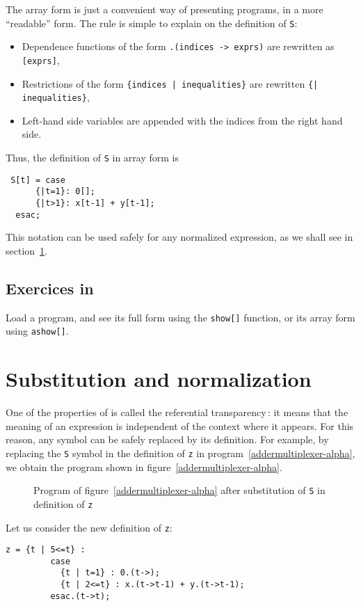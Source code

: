 The array form is just a convenient way of presenting {\alfa} programs, 
in a more ``readable'' form. The rule is simple to explain on the 
definition of {\tt S}:
\begin{itemize}
\item Dependence functions of the form {\tt .(indices -> exprs)} are rewritten
as {\tt [exprs]}, 
\item Restrictions of the form {\tt \{indices | inequalities\}} are rewritten
{\tt \{| inequalities\}},
\item Left-hand side variables are appended with the indices from the
right hand side.
\end{itemize}
Thus, the definition of {\tt S} in array form is
\begin{verbatim}
 S[t] = case
      {|t=1}: 0[];
      {|t>1}: x[t-1] + y[t-1];
  esac;
\end{verbatim}
This notation can be used safely for any normalized expression, as 
we shall see in section~\ref{substitution}.
\subsection*{Exercices in {\mmalfa}}
Load a program, and see its full form using the {\tt show[]}
function, or its array form using {\tt ashow[]}.
\section{Substitution and normalization}
\label{substitution}
One of the properties of {\alfa} is called the referential transparency\,:
it means that the meaning of an expression is independent of the context
where it appears. 
For this reason, any symbol can be safely replaced by its definition. 
For example, by replacing the {\tt S} symbol in the definition of 
{\tt z} in program~\ref{addermultiplexer-alpha}, we obtain the 
program shown in figure~\ref{addermultiplexer-alpha}.
\begin{figure}[htbp]

\caption{Program of figure~\ref{addermultiplexer-alpha} after substitution of {\tt S} in 
definition of {\tt z}}\label{addersubstituted-alpha}
\end{figure}



Let us consider the new definition of {\tt z}:
\begin{verbatim}
z = {t | 5<=t} : 
         case
           {t | t=1} : 0.(t->);
           {t | 2<=t} : x.(t->t-1) + y.(t->t-1);
         esac.(t->t);
\end{verbatim}

